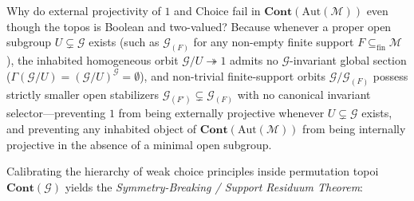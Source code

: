 Why do external projectivity of $1$ and Choice fail in $\mathbf{Cont}(\mathrm{Aut}(\mathcal{M}))$ even though the topos is Boolean and two-valued? Because whenever a proper open subgroup $U \subsetneq \mathcal{G}$ exists (such as $\mathcal{G}_{(F)}$ for any non-empty finite support $F \subseteq_{\mathrm{fin}} \mathcal{M}$), the inhabited homogeneous orbit $\mathcal{G}/U \twoheadrightarrow 1$ admits no $\mathcal{G}$-invariant global section ($\Gamma(\mathcal{G}/U) = (\mathcal{G}/U)^{\mathcal{G}} = \emptyset$), and non-trivial finite-support orbits $\mathcal{G}/\mathcal{G}_{(F)}$ possess strictly smaller open stabilizers $\mathcal{G}_{(F')} \subsetneq \mathcal{G}_{(F)}$ with no canonical invariant selector---preventing $1$ from being externally projective whenever $U \subsetneq \mathcal{G}$ exists, and preventing any inhabited object of $\mathbf{Cont}(\mathrm{Aut}(\mathcal{M}))$ from being internally projective in the absence of a minimal open subgroup.

Calibrating the hierarchy of weak choice principles inside permutation topoi $\mathbf{Cont}(\mathcal{G})$ yields the \emph{Symmetry-Breaking / Support Residuum Theorem}:


